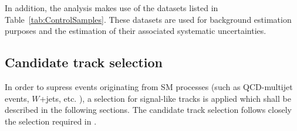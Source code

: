 In addition, the analysis makes use of the datasets listed in Table~\ref{tab:ControlSamples}.
These datasets are used for background estimation purposes and the estimation of their associated systematic uncertainties.
\renewcommand{\arraystretch}{1.5}
\begin{table}[!hbt]
\centering
\caption{Further datasets used for background estimation.}
\label{tab:ControlSamples}
\end{table}  
\subsection{Candidate track selection}

In order to supress events originating from SM processes (such as QCD-multijet events, $W$+jets, etc. ), a selection for signal-like tracks is applied which shall be described in the following sections.
The candidate track selection follows closely the selection required in \cite{bib:CMS:DT_8TeV}.\\

